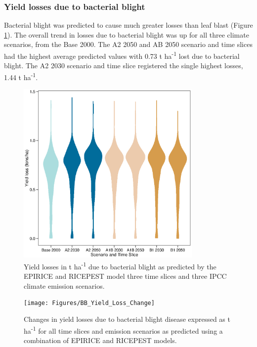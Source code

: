 \documentclass[preprint,review,12pt]{elsarticle}
\begin{document}
    \subsubsection{Yield losses due to bacterial blight}
    Bacterial blight was predicted to cause much greater losses than leaf blast (Figure \ref{BB_Losses_Violin}). The overall trend in losses due to bacterial blight was up for all three climate scenarios, from the Base 2000. The A2 2050 and AB 2050 scenario and time slices had the highest average predicted values with 0.73 t ha\textsuperscript{-1} lost due to bacterial blight. The A2 2030 scenario and time slice registered the single highest losses, 1.44 t ha\textsuperscript{-1}.
    
    \begin{figure}[H]
      \includegraphics[width = 90mm]{Figures/BB_Losses_Violin}
      \caption{Yield losses in t ha\textsuperscript{-1} due to bacterial blight as predicted by the EPIRICE and RICEPEST model three time slices and three IPCC climate emission scenarios.}
      \label{BB_Losses_Violin}
    \end{figure}
    
    
    \begin{figure}[H]
      \texttt{[image: Figures/BB\_Yield\_Loss\_Change]}
      \caption{Changes in yield losses due to bacterial blight disease expressed as t ha\textsuperscript{-1} for all time slices and emission scenarios as predicted using a combination of EPIRICE and RICEPEST models.}
      \label{BB_Change_Map}
    \end{figure}
    
\end{document}
